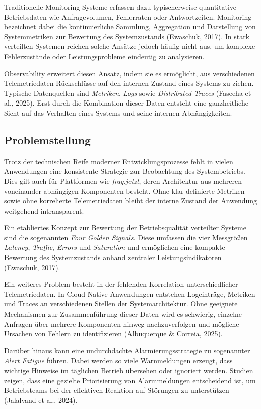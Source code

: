 Traditionelle Monitoring-Systeme erfassen dazu typischerweise quantitative Betriebsdaten wie Anfragevolumen, Fehlerraten oder Antwortzeiten. Monitoring bezeichnet dabei die kontinuierliche Sammlung, Aggregation und Darstellung von Systemmetriken zur Bewertung des Systemzustands (Ewaschuk, 2017). In stark verteilten Systemen reichen solche Ansätze jedoch häufig nicht aus, um komplexe Fehlerzustände oder Leistungsprobleme eindeutig zu analysieren.

Observability erweitert diesen Ansatz, indem sie es ermöglicht, aus verschiedenen Telemetriedaten Rückschlüsse auf den internen Zustand eines Systems zu ziehen. Typische Datenquellen sind \emph{Metriken}, \emph{Logs} sowie \emph{Distributed Traces} (Faseeha et al., 2025). Erst durch die Kombination dieser Daten entsteht eine ganzheitliche Sicht auf das Verhalten eines Systems und seine internen Abhängigkeiten.

\subsection{Problemstellung}

Trotz der technischen Reife moderner Entwicklungsprozesse fehlt in vielen Anwendungen eine konsistente Strategie zur Beobachtung des Systembetriebs. Dies gilt auch für Plattformen wie \emph{frag.jetzt}, deren Architektur aus mehreren voneinander abhängigen Komponenten besteht. Ohne klar definierte Metriken sowie ohne korrelierte Telemetriedaten bleibt der interne Zustand der Anwendung weitgehend intransparent.

Ein etabliertes Konzept zur Bewertung der Betriebsqualität verteilter Systeme sind die sogenannten \emph{Four Golden Signals}. Diese umfassen die vier Messgrößen \emph{Latency}, \emph{Traffic}, \emph{Errors} und \emph{Saturation} und ermöglichen eine kompakte Bewertung des Systemzustands anhand zentraler Leistungsindikatoren (Ewaschuk, 2017).

Ein weiteres Problem besteht in der fehlenden Korrelation unterschiedlicher Telemetriedaten. In Cloud-Native-Anwendungen entstehen Logeinträge, Metriken und Traces an verschiedenen Stellen der Systemarchitektur. Ohne geeignete Mechanismen zur Zusammenführung dieser Daten wird es schwierig, einzelne Anfragen über mehrere Komponenten hinweg nachzuverfolgen und mögliche Ursachen von Fehlern zu identifizieren (Albuquerque \& Correia, 2025).

Darüber hinaus kann eine undurchdachte Alarmierungsstrategie zu sogenannter \emph{Alert Fatigue} führen. Dabei werden so viele Warnmeldungen erzeugt, dass wichtige Hinweise im täglichen Betrieb übersehen oder ignoriert werden. Studien zeigen, dass eine gezielte Priorisierung von Alarmmeldungen entscheidend ist, um Betriebsteams bei der effektiven Reaktion auf Störungen zu unterstützen (Jalalvand et al., 2024).

